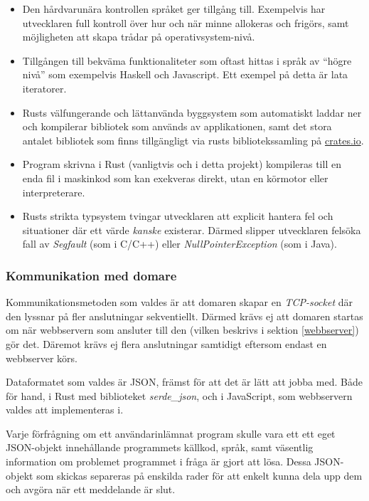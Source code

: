 \documentclass{article}
\begin{document}
\begin{itemize}
	\item Den hårdvarunära kontrollen språket ger tillgång till. Exempelvis har
		utvecklaren full kontroll över hur och när minne allokeras och frigörs,
		samt möjligheten att skapa trådar på operativsystem-nivå.
	\item Tillgången till bekväma funktionaliteter som oftast hittas i språk av
		``högre nivå'' som exempelvis Haskell och Javascript. Ett exempel på
		detta är lata iteratorer.
	\item Rusts välfungerande och lättanvända byggsystem som automatiskt
		laddar ner och kompilerar bibliotek som används av applikationen, samt
		det stora antalet bibliotek som finns tillgängligt via rusts
		bibliotekssamling på \href{https://crates.io}{crates.io}.
	\item Program skrivna i Rust (vanligtvis och i detta projekt) kompileras
		till en enda fil i maskinkod som kan exekveras direkt, utan en körmotor
		eller interpreterare.
	\item Rusts strikta typsystem tvingar utvecklaren att explicit hantera fel
		och situationer där ett värde \textit{kanske} existerar. Därmed slipper
		utvecklaren felsöka fall av \textit{Segfault} (som i C/C++) eller
		\textit{NullPointerException} (som i Java).
\end{itemize}

\subsubsection{Kommunikation med domare}

Kommunikationsmetoden som valdes är att domaren skapar en \textit{TCP-socket}
där den lyssnar på fler anslutningar sekventiellt. Därmed krävs ej att domaren
startas om när webbservern som ansluter till den (vilken beskrivs i sektion
\ref{webbserver}) gör det. Däremot krävs ej flera anslutningar samtidigt
eftersom endast en webbserver körs.

Dataformatet som valdes är JSON, främst för att det är lätt att jobba med. Både
för hand, i Rust med biblioteket \textit{serde\_json}, och i JavaScript, som
webbservern valdes att implementeras i.

Varje förfrågning om ett användarinlämnat program skulle vara ett ett eget
JSON-objekt innehållande programmets källkod, språk, samt väsentlig information
om problemet programmet i fråga är gjort att lösa. Dessa JSON-objekt som skickas
separeras på enskilda rader för att enkelt kunna dela upp dem och avgöra när ett
meddelande är slut.
\end{document}
